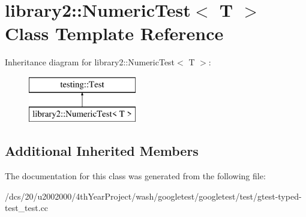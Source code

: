 \hypertarget{classlibrary2_1_1NumericTest}{}\section{library2\+:\+:Numeric\+Test$<$ T $>$ Class Template Reference}
\label{classlibrary2_1_1NumericTest}
Inheritance diagram for library2\+:\+:Numeric\+Test$<$ T $>$\+:\begin{figure}[H]
\begin{center}
\leavevmode
\includegraphics[height=2.000000cm]{classlibrary2_1_1NumericTest}
\end{center}
\end{figure}
\subsection*{Additional Inherited Members}


The documentation for this class was generated from the following file\+:\begin{DoxyCompactItemize}
\item 
/dcs/20/u2002000/4th\+Year\+Project/wash/googletest/googletest/test/gtest-\/typed-\/test\+\_\+test.\+cc\end{DoxyCompactItemize}
